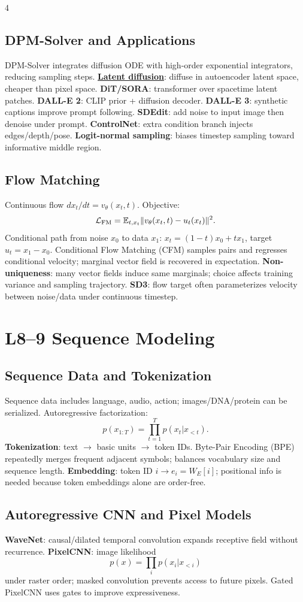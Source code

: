 \documentclass{article}
\newcommand{\key}[1]{\textbf{#1}}
\newcommand{\lowterm}[1]{\textbf{\underline{#1}}}
\newcommand{\E}{\mathbb{E}}
\newcommand{\1}{\mathbf 1}
\begin{document}
\begin{multicols*}{4}
\subsection{DPM-Solver and Applications}
DPM-Solver integrates diffusion ODE with high-order exponential integrators, reducing sampling steps. \lowterm{Latent diffusion}: diffuse in autoencoder latent space, cheaper than pixel space. \key{DiT/SORA}: transformer over spacetime latent patches. \key{DALL-E 2}: CLIP prior + diffusion decoder. \key{DALL-E 3}: synthetic captions improve prompt following. \key{SDEdit}: add noise to input image then denoise under prompt. \key{ControlNet}: extra condition branch injects edges/depth/pose. \key{Logit-normal sampling}: biases timestep sampling toward informative middle region.

\subsection{Flow Matching}
Continuous flow $dx_t/dt=v_\theta(x_t,t)$. Objective:
\[
\mathcal L_{\rm FM}=\E_{t,x_t}\|v_\theta(x_t,t)-u_t(x_t)\|^2.
\]
Conditional path from noise $x_0$ to data $x_1$: $x_t=(1-t)x_0+tx_1$, target $u_t=x_1-x_0$. Conditional Flow Matching (CFM) samples pairs and regresses conditional velocity; marginal vector field is recovered in expectation. \key{Non-uniqueness}: many vector fields induce same marginals; choice affects training variance and sampling trajectory. \key{SD3}: flow target often parameterizes velocity between noise/data under continuous timestep.

\section{L8--9 Sequence Modeling}
\subsection{Sequence Data and Tokenization}
Sequence data includes language, audio, action; images/DNA/protein can be serialized. Autoregressive factorization:
\[
p(x_{1:T})=\prod_{t=1}^T p(x_t|x_{<t}).
\]
\key{Tokenization}: text $\to$ basic units $\to$ token IDs. Byte-Pair Encoding (BPE) repeatedly merges frequent adjacent symbols; balances vocabulary size and sequence length. \key{Embedding}: token ID $i\to e_i=W_E[i]$; positional info is needed because token embeddings alone are order-free.

\subsection{Autoregressive CNN and Pixel Models}
\key{WaveNet}: causal/dilated temporal convolution expands receptive field without recurrence. \key{PixelCNN}: image likelihood
\[
p(x)=\prod_i p(x_i|x_{<i})
\]
under raster order; masked convolution prevents access to future pixels. Gated PixelCNN uses gates to improve expressiveness.


\end{multicols*}
\end{document}
